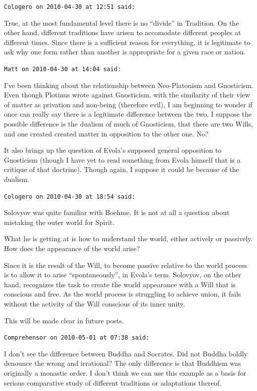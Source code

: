 \begin{footnotesize}
\begin{sffamily}
\texttt{Cologero on 2010-04-30 at 12:51 said:}

True, at the most fundamental level there is no ``divide'' in Tradition. On the other hand, different traditions have arisen to accomodate different peoples at different times. Since there is a sufficient reason for everything, it is legitimate to ask why one form rather than another is appropriate for a given race or nation.

\hfill

\texttt{Matt on 2010-04-30 at 14:04 said:}

I've been thinking about the relationship between Neo-Platonism and Gnosticism. Even though Plotinus wrote against Gnosticism, with the similarity of their view of matter as privation and non-being (therefore evil), I am beginning to wonder if once can really say there is a legitimate difference between the two. I suppose the possible difference is the dualism of much of Gnosticism, that there are two Wills, and one created created matter in opposition to the other one. No?

It also brings up the question of Evola's supposed general opposition to Gnosticism (though I have yet to read something from Evola himself that is a critique of that doctrine). Though again, I suppose it could be because of the dualism.

\hfill

\texttt{Cologero on 2010-04-30 at 18:54 said:}

Solovyov was quite familiar with Boehme. It is not at all a question about mistaking the outer world for Spirit.

What he is getting at is how to understand the world, either actively or passively. How does the appearance of the world arise?

Since it is the result of the Will, to become passive relative to the world process is to allow it to arise ``spontaneously'', in Evola's term. Solovyov, on the other hand, recognizes the task to create the world appearance with a Will that is conscious and free. As the world process is struggling to achieve union, it fails without the activity of the Will conscious of its inner unity.

This will be made clear in future posts.

\hfill

\texttt{Comprehensor on 2010-05-01 at 07:38 said:}

I don't see the difference between Buddha and Socrates. Did not Buddha boldly denounce the wrong and irrational? The only difference is that Buddhism was originally a monastic order. I don't think we can use this example as a basis for serious comparative study of different traditions or adaptations thereof.


\end{sffamily}
\end{footnotesize}
